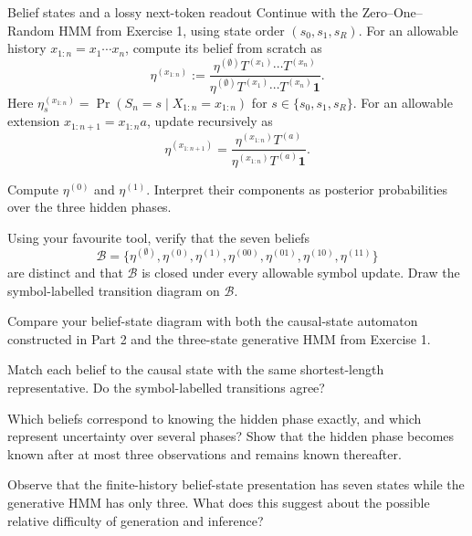 \begin{exercise}[Core]{Belief states and a lossy next-token readout}
  Continue with the Zero--One--Random HMM from Exercise 1, using state
  order $(s_0,s_1,s_R)$. For an allowable history $x_{1:n}=x_1\cdots x_n$,
  compute its belief from scratch as
  \[
    \eta^{(x_{1:n})}
      :=\frac{\eta^{(\emptyset)}T^{(x_1)}\cdots T^{(x_n)}}
        {\eta^{(\emptyset)}T^{(x_1)}\cdots T^{(x_n)}\mathbf 1}.
  \]
  Here $\eta_s^{(x_{1:n})}=\Pr(S_n=s\mid X_{1:n}=x_{1:n})$ for
  $s\in\{s_0,s_1,s_R\}$. For an allowable
  extension $x_{1:n+1}=x_{1:n}a$, update recursively as
  \[
    \eta^{(x_{1:n+1})}
      =\frac{\eta^{(x_{1:n})}T^{(a)}}
        {\eta^{(x_{1:n})}T^{(a)}\mathbf 1}.
  \]

  \begin{parts}
    \item Compute $\eta^{(0)}$ and $\eta^{(1)}$. Interpret their components
      as posterior probabilities over the three hidden phases.

    \item Using your favourite tool, verify that the seven beliefs
      \[
        \mathcal B=
        \bigl\{
          \eta^{(\emptyset)},\eta^{(0)},\eta^{(1)},\eta^{(00)},
          \eta^{(01)},\eta^{(10)},\eta^{(11)}
        \bigr\}
      \]
      are distinct and that $\mathcal B$ is closed under every allowable
      symbol update. Draw the symbol-labelled transition diagram on
      $\mathcal B$.

    \item Compare your belief-state diagram with both the causal-state
      automaton constructed in Part 2 and the three-state generative HMM from
      Exercise 1.
      \begin{subparts}
        \item Match each belief to the causal state with the same
          shortest-length representative. Do the symbol-labelled transitions
          agree?

        \item Which beliefs correspond to knowing the hidden phase exactly,
          and which represent uncertainty over several phases? Show that the
          hidden phase becomes known after at most three observations and
          remains known thereafter.

        \item Observe that the finite-history belief-state presentation has
          seven states while the generative HMM has only three. What does this
          suggest about the possible relative difficulty of generation and
          inference?
      \end{subparts}


\end{parts}
\end{exercise}
